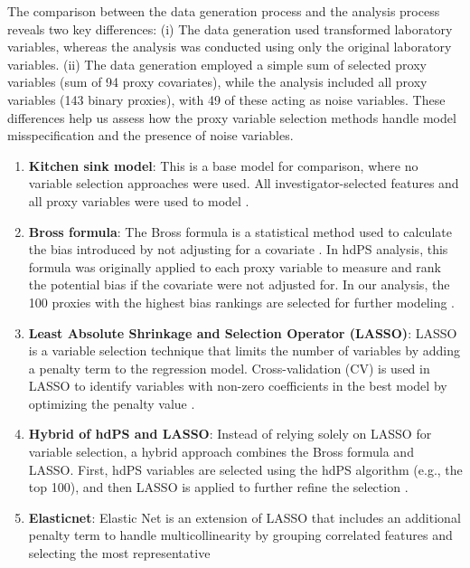 \documentclass[sn-vancouver,Numbered,lineno,pdflatex]{sn-jnl}
\begin{document}
The comparison between the data generation process and the analysis
process reveals two key differences: (i) The data generation used
transformed laboratory variables, whereas the analysis was conducted
using only the original laboratory variables. (ii) The data generation
employed a simple sum of selected proxy variables (sum of 94 proxy
covariates), while the analysis included all proxy variables (143 binary
proxies), with 49 of these acting as noise variables. These differences
help us assess how the proxy variable selection methods handle model
misspecification and the presence of noise variables.

\begin{enumerate}
\def\labelenumi{\arabic{enumi}.}
\item
  \textbf{Kitchen sink model}: This is a base model for comparison,
  where no variable selection approaches were used. All
  investigator-selected features and all proxy variables were used to
  model \citep{karim2018can}.
\item
  \textbf{Bross formula}: The Bross formula is a statistical method used
  to calculate the bias introduced by not adjusting for a covariate
  \citep{bross1966spurious}. In hdPS analysis, this formula was
  originally applied to each proxy variable to measure and rank the
  potential bias if the covariate were not adjusted for. In our
  analysis, the 100 proxies with the highest bias rankings are selected
  for further modeling \citep{schneeweiss2009high, wyss2018erratum}.
\item
  \textbf{Least Absolute Shrinkage and Selection Operator (LASSO)}:
  LASSO is a variable selection technique that limits the number of
  variables by adding a penalty term to the regression model.
  Cross-validation (CV) is used in LASSO to identify variables with
  non-zero coefficients in the best model by optimizing the penalty
  value
  \citep{franklin2015regularized, schneeweiss2017variable, karim2018can}.
\item
  \textbf{Hybrid of hdPS and LASSO}: Instead of relying solely on LASSO
  for variable selection, a hybrid approach combines the Bross formula
  and LASSO. First, hdPS variables are selected using the hdPS algorithm
  (e.g., the top 100), and then LASSO is applied to further refine the
  selection \citep{karim2018can, franklin2015regularized}.
\item
  \textbf{Elasticnet}: Elastic Net is an extension of LASSO that
  includes an additional penalty term to handle multicollinearity by
  grouping correlated features and selecting the most representative

\end{enumerate}
\end{document}
